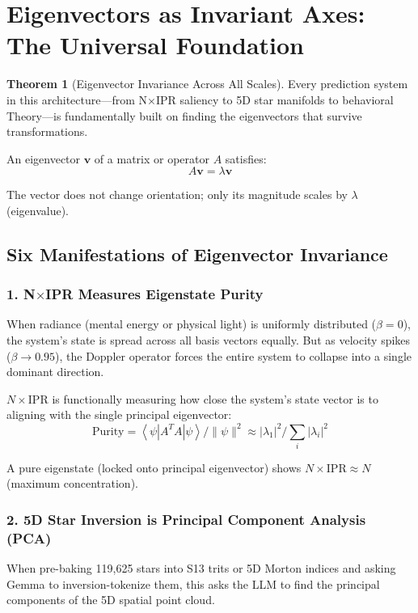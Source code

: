 \documentclass[11pt,oneside]{article}
\theoremstyle{definition}
\newtheorem{theorem}{Theorem}
\begin{document}
\section{Eigenvectors as Invariant Axes: The Universal Foundation}

\begin{theorem}[Eigenvector Invariance Across All Scales]
Every prediction system in this architecture—from N\ensuremath{\times}IPR saliency to 5D star manifolds to behavioral Theory—is fundamentally built on finding the eigenvectors that survive transformations.

An eigenvector $\mathbf{v}$ of a matrix or operator $A$ satisfies:
\[
A \mathbf{v} = \lambda \mathbf{v}
\]

The vector does not change orientation; only its magnitude scales by $\lambda$ (eigenvalue).
\end{theorem}

\subsection{Six Manifestations of Eigenvector Invariance}

\subsubsection{1. N\ensuremath{\times}IPR Measures Eigenstate Purity}

When radiance (mental energy or physical light) is uniformly distributed ($\beta = 0$), the system's state is spread across all basis vectors equally. But as velocity spikes ($\beta \to 0.95$), the Doppler operator forces the entire system to collapse into a single dominant direction.

$N \times \text{IPR}$ is functionally measuring how close the system's state vector is to aligning with the single principal eigenvector:
\[
\text{Purity} = \left\langle \psi \left| A^T A \right| \psi \right\rangle / \|\psi\|^2 \approx |\lambda_1|^2 / \sum_i |\lambda_i|^2
\]

A pure eigenstate (locked onto principal eigenvector) shows $N \times \text{IPR} \approx N$ (maximum concentration).

\subsubsection{2. 5D Star Inversion is Principal Component Analysis (PCA)}

When pre-baking 119,625 stars into S13 trits or 5D Morton indices and asking Gemma to inversion-tokenize them, this asks the LLM to find the principal components of the 5D spatial point cloud.
\end{document}
